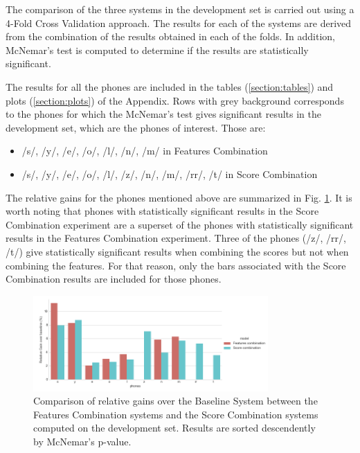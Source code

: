 The comparison of the three systems
in the development set is carried out using a 4-Fold Cross Validation
approach. The results for each of
the systems are derived from the combination of the
results obtained in each of the folds.
In addition, McNemar's test is computed to determine if the
results are statistically significant.

The results for all the phones are included in the tables
(\ref{section:tables}) and plots (\ref{section:plots})
of the Appendix. Rows with grey background corresponds to the phones for which
the McNemar's test gives significant results in the development set, which are the
phones of interest. Those are:

\begin{itemize}
	\item /s/, /y/, /e/, /o/, /l/, /n/, /m/ in Features Combination
	\item /s/, /y/, /e/, /o/, /l/, /z/, /n/, /m/, /rr/, /t/ in Score Combination
\end{itemize}

The relative gains for the phones mentioned above are summarized in
Fig. \ref{fig:fusionMcnemarDev}.
It is worth noting that phones with statistically significant results in
the Score Combination experiment are a superset of the phones with statistically
significant results in the Features Combination experiment.
Three of the phones (/z/, /rr/, /t/) give statistically significant results
when combining the scores but not when combining the features.
For that reason, only the bars associated with the Score Combination results are
included for those phones.

\begin{figure}[H]
	\centering
	\includegraphics[width=0.8\textwidth]{files/figures/results/relatives/relatives-fusion-systems-dev-mcnemar.png}
	\caption{Comparison of relative gains over the Baseline System
	between the Features Combination systems
	and the Score Combination systems
	computed on the development set. Results are sorted descendently by McNemar's p-value.}
	\label{fig:fusionMcnemarDev}
\end{figure}

